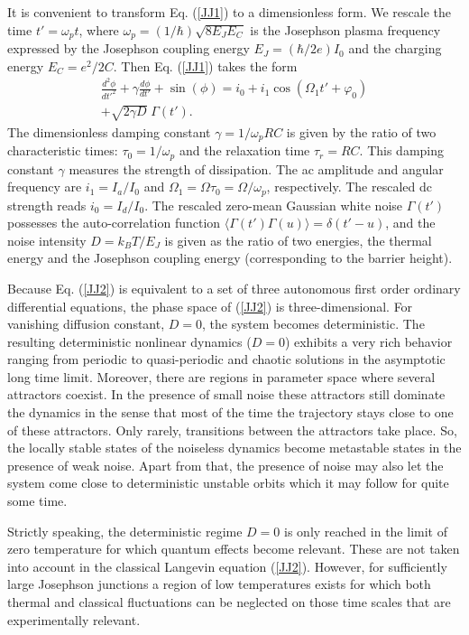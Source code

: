 \documentclass{physeauth}
\begin{document}
It is convenient to transform Eq. (\ref{JJ1}) to a dimensionless
form.  We rescale the time $t'=\omega_p t$, where
$\omega_p=(1/\hbar)\sqrt{8 E_JE_C}$ is the Josephson plasma frequency
expressed by the Josephson coupling energy $E_J=(\hbar/2e)I_0$ and the
charging energy $E_C=e^2/2 C$. Then Eq. (\ref{JJ1}) takes the form
\cite{barone,kautz}
%
\begin{eqnarray}
\label{JJ2} \frac{d^2 \phi}{dt'^2} + {\gamma} \frac {d  \phi}{d t'}
+ \sin (\phi)  = i_0 
+ i_1  \cos(\Omega_1 t' +\varphi_0)
 \nonumber \\+ \sqrt{2 \gamma D} \; \Gamma(t').
\end{eqnarray}
%
The dimensionless damping  constant ${\gamma} = 1/\omega_p RC$ is
given by the ratio of two characteristic times: $\tau_0=1/\omega_p$
and the relaxation time $\tau_r = RC$. This damping  constant 
$\gamma$ measures the strength of dissipation. The ac amplitude and 
angular frequency are $i_1 = I_a / I_0$ and
$\Omega_1 = \Omega \tau_0=\Omega/\omega_p$, respectively.  The
rescaled dc strength reads $i_0= I_d/ I_0$. The rescaled zero-mean
Gaussian white noise $\Gamma(t')$ possesses the auto-correlation
function $\langle \Gamma(t')\Gamma(u)\rangle=\delta(t'-u)$, and the
noise intensity $D = k_B T / E_J$ is given as the ratio of two
energies, the thermal energy and the Josephson coupling energy
(corresponding to the barrier height).

Because Eq.  (\ref{JJ2}) is equivalent to a set of three autonomous
first order ordinary differential equations, the phase space of (\ref{JJ2}) is
three-dimensional. For vanishing diffusion constant, $D=0$, the system
becomes deterministic.  The resulting deterministic nonlinear dynamics ($D = 0$)
exhibits a very rich behavior ranging from periodic to quasi-periodic
and chaotic solutions in the asymptotic long time limit. Moreover,
there are regions in parameter space where several attractors coexist.
In the presence of small noise these attractors still dominate the
dynamics in the sense that most of the time the trajectory stays close
to one of these attractors. Only rarely, transitions between the
attractors take place. So, the locally stable states of the noiseless
dynamics become metastable states in the presence of weak noise. 
Apart from that, the presence of noise may also let the system come 
close to deterministic unstable orbits which it may follow for quite some time. 

Strictly speaking, the deterministic regime $D=0$ is only reached in
the limit of zero temperature for which quantum effects become
relevant. These are not taken into account in the classical Langevin
equation (\ref{JJ2}). However, for sufficiently large Josephson
junctions  a region of low temperatures exists
for which both thermal and classical fluctuations can be neglected on
those time scales that are experimentally relevant.
\end{document}
